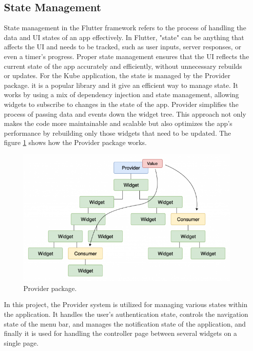 \subsection{State Management}
State management in the Flutter framework refers to the process of handling the data and UI states
of an app effectively. In Flutter, "state" can be anything that affects the UI and needs to be
tracked, such as user inputs, server responses, or even a timer's progress. Proper state management
ensures that the UI reflects the current state of the app accurately and efficiently, without
unnecessary rebuilds or updates. For the Kube application, the state is managed by the Provider
package. it is a popular library and it give an efficient way to manage state. It works by using a
mix of dependency injection and state management, allowing widgets to subscribe to changes in the
state of the app. Provider simplifies the process of passing data and events down the widget tree.
This approach not only makes the code more maintainable and scalable but also optimizes the app's
performance by rebuilding only those widgets that need to be updated. The figure
\ref{fig:5_provider} shows how the Provider package works.

\begin{figure}
    \centering
    \includegraphics[scale=0.5]{Pictures/5_provider.png}
    \caption{Provider package.}
    \label{fig:5_provider}
\end{figure}

In this project, the Provider system is utilized for managing various states within the application.
It handles the user's authentication state, controls the navigation state of the menu bar, and
manages the notification state of the application, and finally it is used for handling the
controller page between several widgets on a single page.

